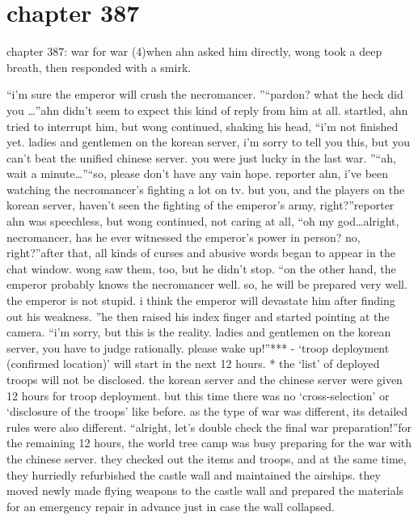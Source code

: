 \section{chapter 387}

chapter 387: war for war (4)when ahn asked him directly, wong took a deep breath, then responded with a smirk.





“i’m sure the emperor will crush the necromancer.
”“pardon? what the heck did you …”ahn didn’t seem to expect this kind of reply from him at all.
 startled, ahn tried to interrupt him, but wong continued, shaking his head, “i’m not finished yet.
 ladies and gentlemen on the korean server, i’m sorry to tell you this, but you can’t beat the unified chinese server.
 you were just lucky in the last war.
”“ah, wait a minute…”“so, please don’t have any vain hope.
 reporter ahn, i’ve been watching the necromancer’s fighting a lot on tv.
 but you, and the players on the korean server, haven’t seen the fighting of the emperor’s army, right?”reporter ahn was speechless, but wong continued, not caring at all, “oh my god…alright, necromancer, has he ever witnessed the emperor’s power in person? no, right?”after that, all kinds of curses and abusive words began to appear in the chat window.
wong saw them, too, but he didn’t stop.
“on the other hand, the emperor probably knows the necromancer well.
 so, he will be prepared very well.
 the emperor is not stupid.
 i think the emperor will devastate him after finding out his weakness.
”he then raised his index finger and started pointing at the camera.
“i’m sorry, but this is the reality.
 ladies and gentlemen on the korean server, you have to judge rationally.
 please wake up!”***
- ‘troop deployment (confirmed location)’ will start in the next 12 hours.
* the ‘list’ of deployed troops will not be disclosed.
the korean server and the chinese server were given 12 hours for troop deployment.
but this time there was no ‘cross-selection’ or ‘disclosure of the troops’ like before.
 as the type of war was different, its detailed rules were also different.
“alright, let’s double check the final war preparation!”for the remaining 12 hours, the world tree camp was busy preparing for the war with the chinese server.
 they checked out the items and troops, and at the same time, they hurriedly refurbished the castle wall and maintained the airships.
they moved newly made flying weapons to the castle wall and prepared the materials for an emergency repair in advance just in case the wall collapsed.
